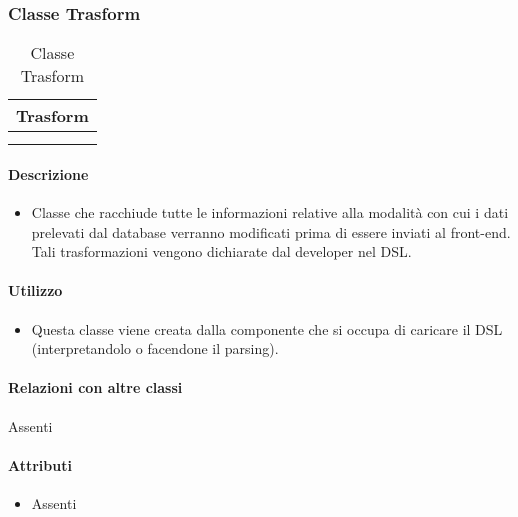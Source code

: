 \subsubsection{Classe Trasform}

\begin{table}[H]
\begin{center}
\bgroup
\setlength{\arrayrulewidth}{0.6mm}
\def\arraystretch{1}
\begin{tabular}{ | p{12cm} | }
\hline
\centerline{\textbf{Trasform}}
\\ \hline
 \\ 
\hline
 \\ 
\hline
\end{tabular}
\egroup
\caption{Classe Trasform}
\end{center}
\end{table}

\paragraph*{Descrizione}
\begin{itemize}
\item[] Classe che racchiude tutte le informazioni relative alla modalità con cui i dati prelevati dal database verranno modificati prima di essere inviati al front-end.
Tali trasformazioni vengono dichiarate dal developer nel DSL.
\end{itemize}

\paragraph*{Utilizzo}
\begin{itemize}
\item[] Questa classe viene creata dalla componente che si occupa di caricare il DSL (interpretandolo o facendone il parsing).
\end{itemize}

\paragraph*{Relazioni con altre classi}
Assenti

\paragraph*{Attributi}
\begin{itemize}
\item[] Assenti
\end{itemize}

